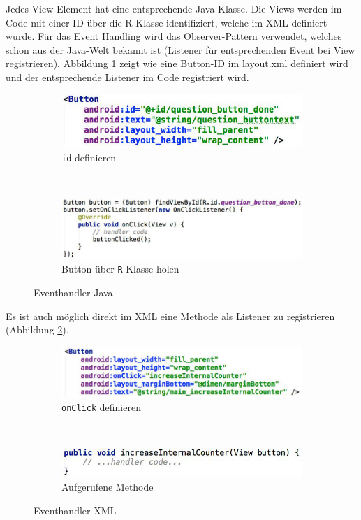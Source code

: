 Jedes View-Element hat eine entsprechende Java-Klasse. Die Views werden im Code mit einer ID über die R-Klasse identifiziert, welche im XML definiert wurde. Für das Event Handling wird das Observer-Pattern verwendet, welches schon aus der Java-Welt bekannt ist (Listener für entsprechenden Event bei View registrieren). Abbildung \ref{fig:event-java} zeigt wie eine Button-ID im layout.xml definiert wird und der entsprechende Listener im Code registriert wird.
\begin{figure}
	\centering
	\begin{subfigure}[b]{0.48\textwidth}
		\includegraphics[width=\textwidth]{fig/event-java-id}
		\caption{\texttt{id} definieren}
	\end{subfigure}
	~
	\begin{subfigure}[b]{0.48\textwidth}
		\includegraphics[width=\textwidth]{fig/event-java-listener}
		\caption{Button über \texttt{R}-Klasse holen}
	\end{subfigure}
	\caption{Eventhandler Java}
	\label{fig:event-java}
\end{figure}
Es ist auch möglich direkt im XML eine Methode als Listener zu registrieren (Abbildung \ref{fig:event-xml}).
\begin{figure}
	\centering
	\begin{subfigure}[b]{0.48\textwidth}
		\includegraphics[width=\textwidth]{fig/event-xml-onclick}
		\caption{\texttt{onClick} definieren}
	\end{subfigure}
	~
	\begin{subfigure}[b]{0.48\textwidth}
		\includegraphics[width=\textwidth]{fig/event-xml-method}
		\caption{Aufgerufene Methode}
	\end{subfigure}
	\caption{Eventhandler XML}
	\label{fig:event-xml}
\end{figure}


